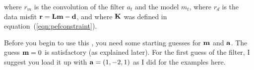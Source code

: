 where $r_m$ is the convolution of the filter $a_t$ and the model $m_t$,
where $r_d$ is the data misfit $ \bold r = \bold L\bold m - \bold d $,
and where $\bold K$ was defined in equation~(\ref{eqn:pefconstraint}).
\par
Before you begin to use this ,
you need some starting guesses for $\bold m$ and $\bold a$.
The guess $\bold m = 0$ is satisfactory (as explained later).
For the first guess of the filter, I suggest you load it up with 
$\bold a = (1,-2,1)$ as I did for the examples here.
%
%
